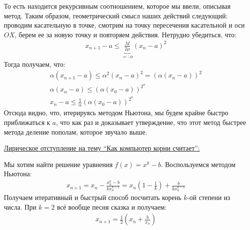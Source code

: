То есть находится рекурсивным соотношением, которое мы ввели, описывая метод. Таким образом, геометрический смысл наших действий следующий: 
проводим касательную в точке, смотрим на точку пересечения касательной и оси $OX$, берем ее за новую точку и повторяем действия. 
Нетрудно убедиться, что:
\begin{gather*}
    x_{n+1} - a \leqslant \underbrace{\frac{M}{2\mu}}_{=:\alpha} (x_n - a)^2
\end{gather*}
Тогда получаем, что: 
\begin{gather*}
    \alpha(x_{n+1} - a) \leqslant \alpha^2 (x_n - a)^2 = (\alpha(x_n - a))^2 \\
    \alpha(x_n - a) \leqslant (\alpha (x_0 - a))^{2^n} \\
    x_n - a \leqslant \frac{1}{\alpha} (\alpha(x_0 - a))^{2^n}
\end{gather*}
Отсюда видно, что, итерируясь методом Ньютона, мы будем крайне быстро приближаться к $a$, 
что как раз и доказывает утверждение, что этот метод быстрее метода деление пополам, которое звучало выше.
\begin{center}
    \underline{Лирическое отступление на тему ``Как компьютер корни считает'':}
\end{center}
\vspace*{0.25cm}
Мы хотим найти решение уравнения $f(x) = x^k - b$. Воспользуемся методом Ньютона: 
\begin{gather*}
    x_{n+1} = x_n - \frac{x_n^k - b}{k x_n^{k-1}} = x_n \left(1 - \frac{1}{k} \right) + \frac{b}{k x_n^{k-1}}
\end{gather*}
Получаем итеративный и быстрый способ посчитать корень $k$-ой степени из числа. При $k=2$ всё вообще песня сказка и получаем: 
\begin{gather*}
    x_{n+1} = \frac{1}{2}\left(x_n + \frac{b}{x_n}\right)
\end{gather*}
